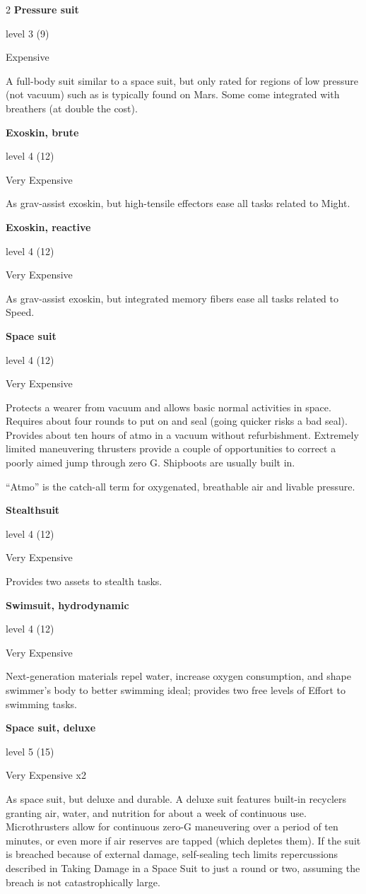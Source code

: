 \begin{multicols}{2}
\textbf{Pressure suit}

level 3 (9) 

Expensive 

A full-body suit similar to a space suit, but only rated for regions of low pressure (not vacuum) such as is typically found on Mars. Some come integrated with breathers (at double the cost). 

\textbf{Exoskin, brute}

level 4 (12) 

Very Expensive 

As grav-assist exoskin, but high-tensile effectors ease all tasks related to Might. 

\textbf{Exoskin, reactive} 

level 4 (12) 

Very Expensive 

As grav-assist exoskin, but integrated memory fibers ease all tasks related to Speed. 

\textbf{Space suit} 

level 4 (12) 

Very Expensive 

Protects a wearer from vacuum and allows basic normal activities in space. Requires about four rounds to put on and seal (going quicker risks a bad seal). Provides about ten hours of atmo in a vacuum without refurbishment. Extremely limited maneuvering thrusters provide a couple of opportunities to correct a poorly aimed jump through zero G. Shipboots are usually built in. 

“Atmo” is the catch-all term for oxygenated, breathable air and livable pressure.

\textbf{Stealthsuit} 

level 4 (12) 

Very Expensive 

Provides two assets to stealth tasks. 

\textbf{Swimsuit, hydrodynamic} 

level 4 (12) 

Very Expensive 

Next-generation materials repel water, increase oxygen consumption, and shape swimmer’s body to better swimming ideal; provides two free levels of Effort to swimming tasks. 

\textbf{Space suit, deluxe} 

level 5 (15) 

Very Expensive x2 

As space suit, but deluxe and durable. A deluxe suit features built-in recyclers granting air, water, and nutrition for about a week of continuous use. Microthrusters allow for continuous zero-G maneuvering over a period of ten minutes, or even more if air reserves are tapped (which depletes them). If the suit is breached because of external damage, self-sealing tech limits repercussions described in Taking Damage in a Space Suit to just a round or two, assuming the breach is not catastrophically large.


\end{multicols}
